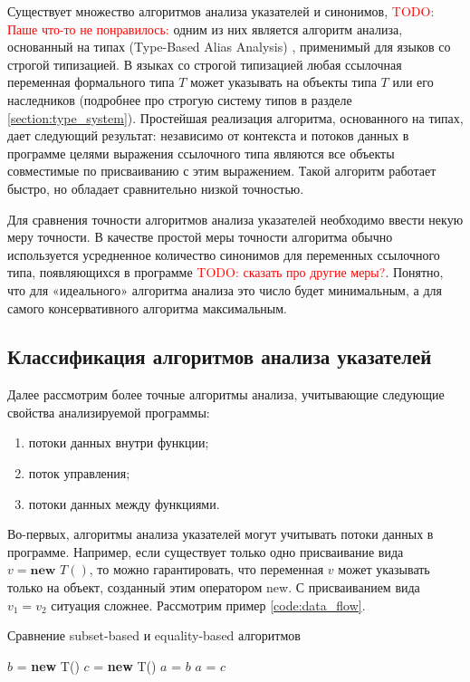 \documentclass[14pt,titlepage]{extarticle}
\newcommand{\NEW}{\textbf{new }}
\newcommand{\todo}[1]{\textcolor{red}{\eng{TODO}: #1}}
\newcommand{\eng}[1]{{\English#1}}
\begin{document}
    Существует множество алгоритмов анализа указателей и синонимов,
    \todo{Паше что-то не понравилось:}
    одним из них является алгоритм анализа, основанный на типах
    (\eng{Type-Based Alias Analysis}) \cite{diwan_tbaa},
    применимый для языков со строгой типизацией.
    В языках со строгой типизацией любая ссылочная переменная формального типа
    $T$ может указывать на объекты типа $T$ или его наследников
    (подробнее про строгую систему типов в разделе \ref{section:type_system}).
    Простейшая реализация алгоритма, основанного на типах, дает следующий
    результат: независимо от контекста и потоков данных в программе целями
    выражения ссылочного типа являются все объекты совместимые по присваиванию
    с этим выражением.
    Такой алгоритм работает быстро, но обладает сравнительно низкой точностью.

    Для сравнения точности алгоритмов анализа указателей необходимо ввести
    некую меру точности. В качестве простой меры точности алгоритма обычно
    используется усредненное количество синонимов для переменных ссылочного
    типа, появляющихся в программе \cite{hind_pointer_analysis_not_solved_yet}
    \todo{сказать про другие меры?}.
    Понятно, что для «идеального» алгоритма анализа это число будет
    минимальным, а для самого консервативного алгоритма максимальным.

    \subsection{Классификация алгоритмов анализа указателей}
    \label{section:analysis_classification}

      Далее рассмотрим более точные алгоритмы анализа, учитывающие следующие
      свойства анализируемой программы:
      \begin{enumerate}
        \item потоки данных внутри функции;
        \item поток управления;
        \item потоки данных между функциями.
      \end{enumerate}

      Во-первых, алгоритмы анализа указателей могут учитывать потоки данных в
      программе.
      Например, если существует только одно присваивание вида $v = \NEW T()$,
      то можно гарантировать, что переменная $v$ может указывать только на
      объект, созданный этим оператором \eng{new}.
      С присваиванием вида $v_1 = v_2$ ситуация сложнее. Рассмотрим пример
      \ref{code:data_flow}.
      \begin{algorithm}
        \caption{Сравнение \eng{subset-based} и \eng{equality-based} алгоритмов}
        \label{code:data_flow}
        \begin{algorithmic}[1]
          \STATE $b$ = \NEW T()
          \STATE $c$ = \NEW T()
          \STATE $a$ = $b$
          \STATE $a$ = $c$
        \end{algorithmic}
      \end{algorithm}
\end{document}
